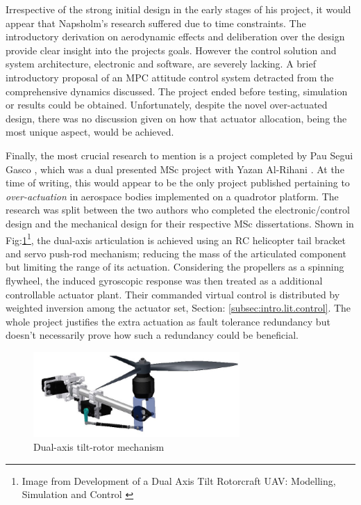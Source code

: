 \par
Irrespective of the strong initial design in the early stages of his project, it would appear that Napsholm's research suffered due to time constraints. The introductory derivation on aerodynamic effects and deliberation over the design provide clear insight into the projects goals. However the control solution and system architecture, electronic and software, are severely lacking. A brief introductory proposal of an MPC attitude control system detracted from the comprehensive dynamics discussed. The project ended before testing, simulation or results could be obtained. Unfortunately, despite the novel over-actuated design, there was no discussion given on how that actuator allocation, being the most unique aspect, would be achieved.
\par
Finally, the most crucial research to mention is a project completed by Pau Segui Gasco \cite{tiltgasco}, which was a dual presented MSc project with Yazan Al-Rihani \cite{tiltrihani}. At the time of writing, this would appear to be the only project published pertaining to \emph{over-actuation} in aerospace bodies implemented on a quadrotor platform. The research was split between the two authors who completed the electronic/control design and the mechanical design for their respective MSc dissertations. Shown in Fig:\ref{fig:tiltrotor-gasco}\footnote{Image from Development of a Dual Axis Tilt Rotorcraft UAV: Modelling, Simulation and Control \cite{tiltgasco}}, the dual-axis articulation is achieved using an RC helicopter tail bracket and servo push-rod mechanism; reducing the mass of the articulated component but limiting the range of its actuation. Considering the propellers as a spinning flywheel, the induced gyroscopic response was then treated as a additional controllable actuator plant. Their commanded virtual control is distributed by weighted inversion among the actuator set, Section: \ref{subsec:intro.lit.control}. The whole project justifies the extra actuation as fault tolerance redundancy but doesn't necessarily prove how such a redundancy could be beneficial.
\begin{figure}[htbp]
\centering
\includegraphics[width=0.7\textwidth]{figs/gasco-mech}
\caption{Dual-axis tilt-rotor mechanism}
\label{fig:tiltrotor-gasco}
\end{figure}
